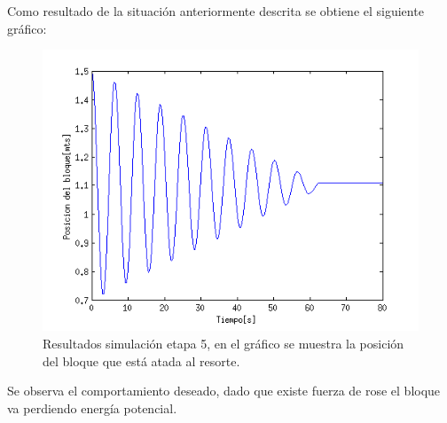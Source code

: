 \documentclass[a4paper,10pt]{article}
\begin{document}
Como resultado de la situación anteriormente descrita se obtiene el siguiente gráfico:


\begin{figure}[H]
 \centering
 \includegraphics[scale=0.5]{./simulacion_etapa5.png}
 \caption{Resultados simulación etapa 5, en el gráfico se muestra la posición del bloque que está atada al resorte.}
  \label{etapa5.2}
\end{figure}

Se observa el comportamiento deseado, dado que existe fuerza de rose el bloque va perdiendo energía potencial.
\end{document}
